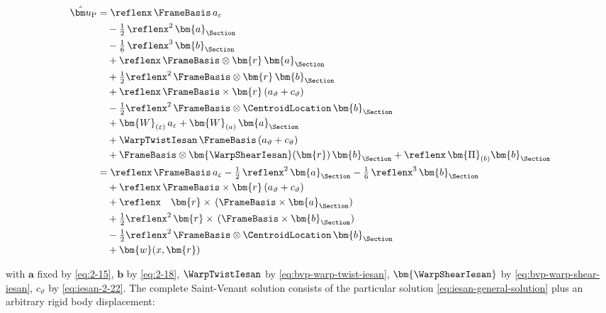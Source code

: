 \begin{Details}
\begin{equation*}
\begin{aligned}
\hat{\bm u}_{\rm P}%
&=
 \reflenx\,\FrameBasis\,a_{\varepsilon} \\
&\quad-\tfrac12\,\reflenx^2\,\bm{a}_{\Section} \\
&\quad-\tfrac16\,\reflenx^3\,\bm{b}_{\Section} \\
&\quad+\reflenx\,\FrameBasis\otimes\bm{r}\,\bm{a}_{\Section} \\
&\quad+\tfrac12 \reflenx^2\,\FrameBasis\otimes\bm{r}\,\bm{b}_{\Section} \\
&\quad+\reflenx\,\FrameBasis\times\bm{r}\,(a_\vartheta+c_{\vartheta}) \\
&\quad-\tfrac12 \reflenx^2\,\FrameBasis\otimes\CentroidLocation\,\bm{b}_{\Section} \\
&\quad+\bm{W}_{(\varepsilon)}\,a_{\varepsilon}
+ \bm{W}_{(a)}\,\bm{a}_{\Section} \\
&\quad+\WarpTwistIesan\,\FrameBasis\,(a_\vartheta+c_{\vartheta}) \\
&\quad+\FrameBasis\otimes\bm{\WarpShearIesan}(\bm{r})\,\bm{b}_{\Section}
+\reflenx\,\bm{\Pi}_{(b)}\bm{b}_{\Section} \\
%
&=
 \reflenx\,\FrameBasis\,a_{\varepsilon}
-\tfrac12\,\reflenx^2\,\bm{a}_{\Section} 
-\tfrac16\,\reflenx^3\,\bm{b}_{\Section} \\
&\quad+\reflenx\,\FrameBasis\times\bm{r}\,(a_\vartheta+c_{\vartheta}) \\
&\quad+\reflenx\quad\bm{r}\times\,(\FrameBasis\times\bm{a}_{\Section}) \\
&\quad+\tfrac12 \reflenx^2\,\bm{r}\times\,(\FrameBasis\times\bm{b}_{\Section}) \\
&\quad-\tfrac12 \reflenx^2\,\FrameBasis\otimes\CentroidLocation\,\bm{b}_{\Section} \\
&\quad+\bm{w}(x,\bm{r})
\end{aligned}
\end{equation*}
\end{Details}
with \(\bm a\) fixed by \eqref{eq:2-15}, \(\bm b\) by \eqref{eq:2-18}, \(\WarpTwistIesan\) by \eqref{eq:bvp-warp-twist-iesan},
\(\bm{\WarpShearIesan}\) by \eqref{eq:bvp-warp-shear-iesan},  \(c_\vartheta\) by \eqref{eq:iesan-2-22}. 
%
The complete Saint-Venant solution consists of the particular solution \eqref{eq:iesan-general-solution} plus an arbitrary rigid body displacement:

